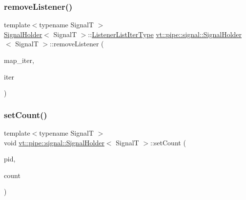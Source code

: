 \subsubsection{\texorpdfstring{remove\+Listener()}{removeListener()}\hspace{0.1cm}{\footnotesize\ttfamily [2/2]}}
{\footnotesize\ttfamily template$<$typename SignalT $>$ \\
\hyperlink{structvt_1_1pipe_1_1signal_1_1_signal_holder}{Signal\+Holder}$<$ SignalT $>$\+::\hyperlink{structvt_1_1pipe_1_1signal_1_1_signal_holder_af0d3ccf4a8700979f414a0485cf41df5}{Listener\+List\+Iter\+Type} \hyperlink{structvt_1_1pipe_1_1signal_1_1_signal_holder}{vt\+::pipe\+::signal\+::\+Signal\+Holder}$<$ SignalT $>$\+::remove\+Listener (\begin{DoxyParamCaption}\item[{\hyperlink{structvt_1_1pipe_1_1signal_1_1_signal_holder_a7f6eed09a10f9b4f679c99ae85983879}{Listener\+Map\+Iter\+Type}}]{map\+\_\+iter,  }\item[{\hyperlink{structvt_1_1pipe_1_1signal_1_1_signal_holder_af0d3ccf4a8700979f414a0485cf41df5}{Listener\+List\+Iter\+Type}}]{iter }\end{DoxyParamCaption})}

\mbox{\label{structvt_1_1pipe_1_1signal_1_1_signal_holder_aa15cf43c4602a9d866f8060746696a45}} 
\subsubsection{\texorpdfstring{set\+Count()}{setCount()}}
{\footnotesize\ttfamily template$<$typename SignalT $>$ \\
void \hyperlink{structvt_1_1pipe_1_1signal_1_1_signal_holder}{vt\+::pipe\+::signal\+::\+Signal\+Holder}$<$ SignalT $>$\+::set\+Count (\begin{DoxyParamCaption}\item[{\hyperlink{namespacevt_ac9852acda74d1896f48f406cd72c7bd3}{Pipe\+Type} const \&}]{pid,  }\item[{\hyperlink{structvt_1_1pipe_1_1signal_1_1_signal_holder_aced54515f402b63f6dea174e5b027c81}{Sig\+Count\+Type} const \&}]{count }\end{DoxyParamCaption})}



